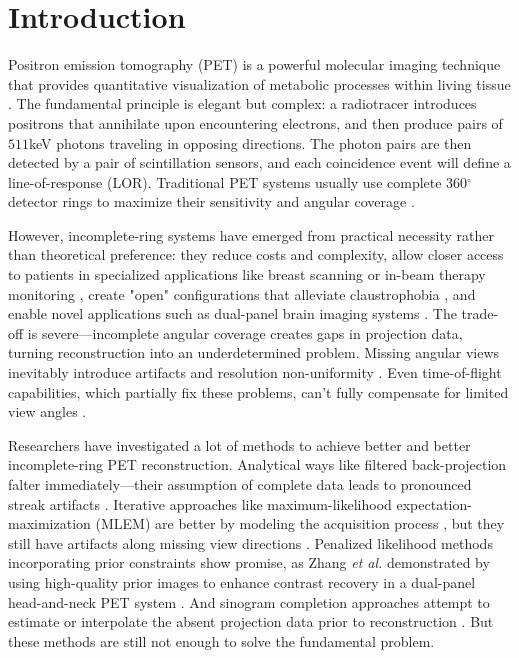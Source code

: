 \documentclass[12pt]{iopart}
\begin{document}
\section{Introduction}
\label{chap:introduction}


Positron emission tomography (PET) is a powerful molecular imaging technique that provides quantitative visualization of metabolic processes within living tissue \cite{townsend2004, muehllehner2006positron, lameka2016positron, shukla2006positron, nutt2002history}. The fundamental principle is elegant but complex: a radiotracer introduces positrons that annihilate upon encountering electrons, and then produce pairs of $511$keV photons traveling in opposing directions. 
The photon pairs are then detected by a pair of scintillation sensors, and each coincidence event will define a line-of-response (LOR).
Traditional PET systems usually use complete 360$^\circ$ detector rings to maximize their sensitivity and angular coverage \cite{townsend2004}.

However, incomplete-ring systems have emerged from practical necessity rather than theoretical preference: they reduce costs and complexity, allow closer access to patients in specialized applications like breast scanning or in-beam therapy monitoring \cite{surti2008}, create "open" configurations that alleviate claustrophobia \cite{tashima2012, krishnamoorthy2021}, and enable novel applications such as dual-panel brain imaging systems \cite{zhang2020}. The trade-off is severe—incomplete angular coverage creates gaps in projection data, turning reconstruction into an underdetermined problem. Missing angular views inevitably introduce artifacts and resolution non-uniformity \cite{kak1988, surti2008}. Even time-of-flight capabilities, which partially fix these problems, can't fully compensate for limited view angles \cite{surti2008, krishnamoorthy2021}.

Researchers have investigated a lot of methods to achieve better and better incomplete-ring PET reconstruction. Analytical ways like filtered back-projection falter immediately—their assumption of complete data leads to pronounced streak artifacts \cite{kak1988}. Iterative approaches like maximum-likelihood expectation-maximization (MLEM) are better by modeling the acquisition process \cite{qi2006}, but they still have artifacts along missing view directions \cite{zhang2020}.
Penalized likelihood methods incorporating prior constraints show promise, as Zhang \textit{et al.} demonstrated by using high-quality prior images to enhance contrast recovery in a dual-panel head-and-neck PET system \cite{zhang2020}. And sinogram completion approaches attempt to estimate or interpolate the absent projection data prior to reconstruction \cite{makkar2024partial}. But these methods are still not enough to solve the fundamental problem. 
\end{document}
